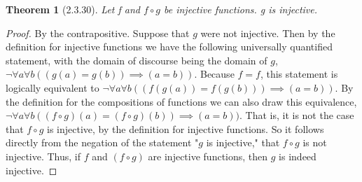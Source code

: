 \documentclass[a4paper, 12pt]{article}
\theoremstyle{plain}
\newtheorem*{theorem*}{Theorem}
\begin{document}
	
	\begin{theorem*}[2.3.30]
		Let f and $f \circ g$ be injective functions. g is injective.
	\end{theorem*}
	
	\begin{proof}
		By the contrapositive. Suppose that $g$ were not injective. Then by the definition for 
		injective functions we have the following universally quantified statement, with the domain 
		of discourse being the domain of $g$, \newline 
		$\lnot \forall a \forall b ((g(a) = g(b)) \implies (a = b))$. Because $f = f$, this 
		statement is logically equivalent to 
		$\lnot \forall a \forall b ((f(g(a)) = f(g(b))) \implies (a = b))$. By the \newline 
		definition for the compositions of functions we can also draw this equivalence, 
		$\lnot \forall a \forall b ((f \circ g)(a) = (f \circ g)(b)) \implies (a = b))$. That is, 
		it is not the case that $f \circ g$ is injective, by the definition for injective functions. 
		So it follows directly from the negation of the statement "$g$ is injective," that 
		$f \circ g$ is not injective. Thus, if $f$ and $(f \circ g)$ are injective functions, then 
		$g$ is indeed injective.
	\end{proof}
\end{document}
